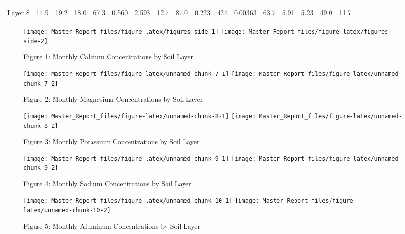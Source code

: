 \documentclass[
]{article}
\begin{document}
\begin{table}[!h]
{\begin{tabular}[t]{lllllllllllllllll}
\cellcolor{gray!6}{Layer 7} & \cellcolor{gray!6}{15.2} & \cellcolor{gray!6}{20.8} & \cellcolor{gray!6}{15.8} & \cellcolor{gray!6}{59.7} & \cellcolor{gray!6}{0.545} & \cellcolor{gray!6}{2.176} & \cellcolor{gray!6}{12.7} & \cellcolor{gray!6}{82.6} & \cellcolor{gray!6}{0.299} & \cellcolor{gray!6}{428} & \cellcolor{gray!6}{0.00473} & \cellcolor{gray!6}{61.3} & \cellcolor{gray!6}{7.32} & \cellcolor{gray!6}{5.14} & \cellcolor{gray!6}{48.3} & \cellcolor{gray!6}{12.8}\\
Layer 8 & 14.9 & 19.2 & 18.0 & 67.3 & 0.560 & 2.593 & 12.7 & 87.0 & 0.223 & 424 & 0.00363 & 63.7 & 5.91 & 5.23 & 49.0 & 11.7\\
\bottomrule
\end{tabular}}
\end{table}

\begin{figure}[H]
\texttt{[image: Master\_Report\_files/figure-latex/figures-side-1]} \texttt{[image: Master\_Report\_files/figure-latex/figures-side-2]} \caption{Figure 1: Monthly Calcium Concentrations by Soil Layer}\label{fig:figures-side}
\end{figure}
\begin{figure}[H]
\texttt{[image: Master\_Report\_files/figure-latex/unnamed-chunk-7-1]} \texttt{[image: Master\_Report\_files/figure-latex/unnamed-chunk-7-2]} \caption{Figure 2: Monthly Magnesium Concentrations by Soil Layer}\label{fig:unnamed-chunk-7}
\end{figure}
\begin{figure}[H]
\texttt{[image: Master\_Report\_files/figure-latex/unnamed-chunk-8-1]} \texttt{[image: Master\_Report\_files/figure-latex/unnamed-chunk-8-2]} \caption{Figure 3: Monthly Potassium Concentrations by Soil Layer}\label{fig:unnamed-chunk-8}
\end{figure}
\begin{figure}[H]
\texttt{[image: Master\_Report\_files/figure-latex/unnamed-chunk-9-1]} \texttt{[image: Master\_Report\_files/figure-latex/unnamed-chunk-9-2]} \caption{Figure 4: Monthly Sodium Concentrations by Soil Layer}\label{fig:unnamed-chunk-9}
\end{figure}

\begin{figure}[H]
\texttt{[image: Master\_Report\_files/figure-latex/unnamed-chunk-10-1]} \texttt{[image: Master\_Report\_files/figure-latex/unnamed-chunk-10-2]} \caption{Figure 5: Monthly Aluminum Concentrations by Soil Layer}\label{fig:unnamed-chunk-10}
\end{figure}
\end{document}
